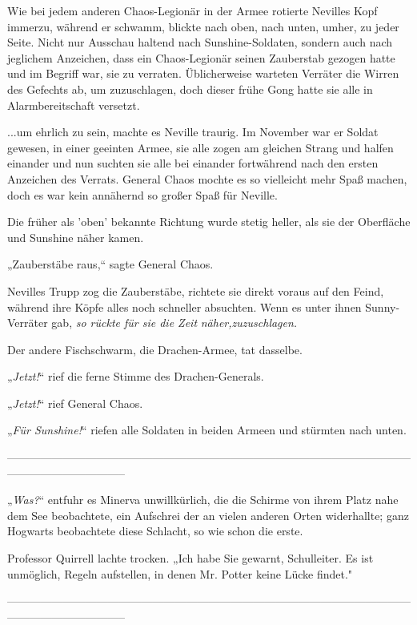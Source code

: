 {Wie bei jedem anderen Chaos-Legionär in der Armee rotierte Nevilles Kopf immerzu, während er schwamm, blickte nach oben, nach unten, umher, zu jeder Seite. Nicht nur Ausschau haltend nach Sunshine-Soldaten, sondern auch nach jeglichem Anzeichen, dass ein Chaos-Legionär seinen Zauberstab gezogen hatte und im Begriff war, sie zu verraten. Üblicherweise warteten Verräter die Wirren des Gefechts ab, um zuzuschlagen, doch dieser frühe Gong hatte sie alle in Alarmbereitschaft versetzt.

...um ehrlich zu sein, machte es Neville traurig. Im November war er Soldat gewesen, in einer geeinten Armee, sie alle zogen am gleichen Strang und halfen einander und nun suchten sie alle bei einander fortwährend nach den ersten Anzeichen des Verrats. General Chaos mochte es so vielleicht mehr Spaß machen, doch es war kein annähernd so großer Spaß für Neville.

Die früher als 'oben' bekannte Richtung wurde stetig heller, als sie der Oberfläche und Sunshine näher kamen.

„Zauberstäbe raus,“ sagte General Chaos.

Nevilles Trupp zog die Zauberstäbe, richtete sie direkt voraus auf den Feind, während ihre Köpfe alles noch schneller absuchten. Wenn es unter ihnen Sunny-Verräter gab, \emph{so rückte für sie die Zeit} \emph{näher,zuzuschlagen.}

Der andere Fischschwarm, die Drachen-Armee, tat dasselbe.

„\emph{Jetzt!}“ rief die ferne Stimme des Drachen-Generals.

„\emph{Jetzt!}“ rief General Chaos.

„\emph{Für Sunshine!}“ riefen alle Soldaten in beiden Armeen und stürmten nach unten.

--------------------------------------------------------------------------------------------------------------------------------------------

\hfill\break „\emph{Was?}“ entfuhr es Minerva unwillkürlich, die die Schirme von ihrem Platz nahe dem See beobachtete, ein Aufschrei der an vielen anderen Orten widerhallte; ganz Hogwarts beobachtete diese Schlacht, so wie schon die erste.

Professor Quirrell lachte trocken. „Ich habe Sie gewarnt, Schulleiter. Es ist unmöglich, Regeln aufstellen, in denen Mr. Potter keine Lücke findet."

--------------------------------------------------------------------------------------------------------------------------------------------

}
